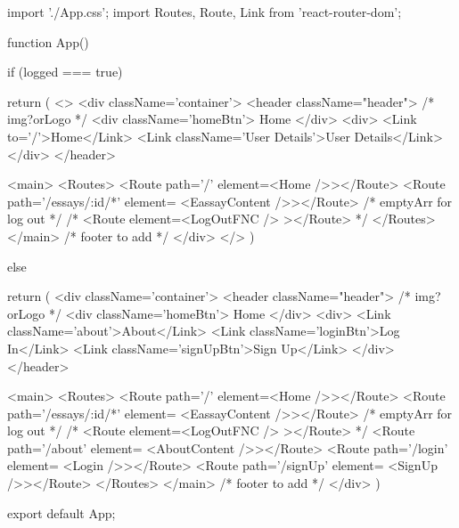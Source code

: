import './App.css';
import { Routes, Route, Link } from 'react-router-dom';



function App() {
  if (logged === true) {
    return (
      <>
        <div className='container'>
            <header className="header">
              {/* img?orLogo */}
              <div className='homeBtn'>
                Home
              </div>
              <div>
                <Link to='/'>Home</Link>
                <Link className='User Details'>User Details</Link>
              </div>
            </header>

            <main>
              <Routes>
                <Route path='/' element={<Home />}></Route>
                <Route path='/essays/:id/*' element={ <EassayContent />}></Route>
                {/* emptyArr for log out */}
                {/* <Route element={<LogOutFNC /> }></Route> */}
              </Routes>
            </main>
            {/* footer to add */}
        </div>
      </>
    )
    }
  else {
    return (
      <div className='container'>
            <header className="header">
              {/* img?orLogo */}
              <div className='homeBtn'>
                Home
              </div>
              <div>
                <Link className='about'>About</Link>
                <Link className='loginBtn'>Log In</Link>
                <Link className='signUpBtn'>Sign Up</Link>
              </div>
            </header>

            <main>
              <Routes>
                <Route path='/' element={<Home />}></Route>
                <Route path='/essays/:id/*' element={ <EassayContent />}></Route>
                {/* emptyArr for log out */}
                {/* <Route element={<LogOutFNC /> }></Route> */}
                <Route path='/about' element={ <AboutContent />}></Route>
                <Route path='/login' element={ <Login />}></Route>
                <Route path='/signUp' element={ <SignUp />}></Route>
              </Routes>
            </main>
            {/* footer to add */}
        </div>
    )
  }
}

export default App;
